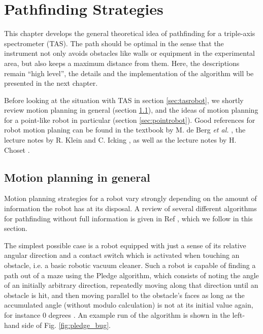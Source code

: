 %
%

\chapter{Pathfinding Strategies}
\label{ch:paths}

This chapter develops the general theoretical idea of pathfinding for a
triple-axis spectrometer (TAS).
The path should be optimal in the sense that the instrument not only avoids 
obstacles like walls or equipment in the experimental area, but also keeps a 
maximum distance from them. 
Here, the descriptions remain ``high level'', the details and the implementation 
of the algorithm will be presented in the next chapter.

Before looking at the situation with TAS in section \ref{sec:tasrobot}, we shortly 
review motion planning in general (section \ref{sec:motionplanning}), and the ideas of
motion planning for a point-like robot in particular (section \ref{sec:pointrobot}).
Good references for robot motion planing can be found in the textbook by 
M. de Berg \textit{et al.} \cite[Ch. 13, pp. 283-306]{Berg2008}, the lecture notes by
R. Klein and C. Icking \cite[Ch. 7, pp. 313-366]{FUH_geo2020}, as well as the lecture 
notes by H. Choset \cite{Choset2010}.


\section{Motion planning in general}
\label{sec:motionplanning}
Motion planning strategies for a robot vary strongly depending on the amount of
information the robot has at its disposal. A review of several different algorithms
for pathfinding without full information is given in Ref \cite[Ch. 7, pp. 313-366]{FUH_geo2020},
which we follow in this section.

The simplest possible case is a robot equipped with just a sense of its relative
angular direction and a contact switch which is activated when touching an obstacle,
i.e. a basic robotic vacuum cleaner.
Such a robot is capable of finding a path out of a maze using the Pledge algorithm,
which consists of noting the angle of an initially arbitrary direction, repeatedly
moving along that direction until an obstacle is hit, and then moving parallel to the
obstacle's faces as long as the accumulated angle (without modulo calculation) 
is not at its initial value again, for instance $0$ degrees \cite[Ch. 7.2, pp. 316-322]{FUH_geo2020}. 
An example run of the algorithm is shown in the left-hand side of Fig. \ref{fig:pledge_bug}.

